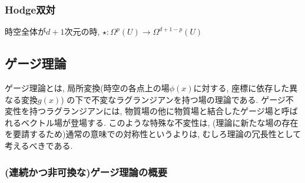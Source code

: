 \subsubsection{Hodge双対}
時空全体が$d+1$次元の時, 
$\star: \Omega^{p}(U)\to \Omega^{d+1-p}(U)$
\subsection{ゲージ理論}
ゲージ理論とは, 局所変換(時空の各点上の場$\phi(x)$に対する, 座標に依存した異なる変換$g(x)$)
の下で不変なラグランジアンを持つ場の理論である. 
ゲージ不変性を持つラグランジアンには, 物質場の他に物質場と結合したゲージ場と呼ばれるベクトル場が登場する. 
このような特殊な不変性は, (理論に新たな場の存在を要請するため)通常の意味での対称性というよりは, むしろ理論の冗長性として考えるべきである. 
\subsubsection{(連続かつ非可換な)ゲージ理論の概要}
